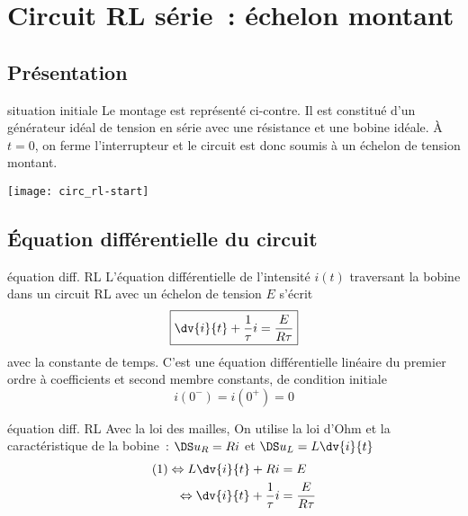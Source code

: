 \documentclass[../main/main.tex]{subfiles}
\begin{document}
\section{Circuit RL série~: échelon montant}
\subsection{Présentation}
\begin{defi}[label=def:echelonL, sidebyside]{situation initiale}
    Le montage est représenté ci-contre. Il est constitué d'un générateur idéal
    de tension en série avec une résistance et une bobine idéale. À $t=0$, on
    ferme l'interrupteur et le circuit est donc soumis à un échelon de tension
    montant.
    \tcblower
    \begin{center}
        \texttt{[image: circ\_rl-start]}
    \end{center}
\end{defi}

\subsection{Équation différentielle du circuit}
\begin{tcbraster}[raster columns=2, raster equal height=rows]
    \begin{prop}[label=prop:eqdiffrc]{équation diff. RL}
        L'équation différentielle de l'intensité $i(t)$ traversant la bobine
        dans un circuit RL avec un échelon de tension $E$ s'écrit
        \[ \boxed{\dv{i}{t} + \frac{1}{\tau}i = \frac{E}{R\tau}}\]
        avec  la constante de temps.
        \tcblower
        C'est une équation différentielle linéaire du premier ordre à
        coefficients et second membre constants, de condition initiale
        \[ \boxed{i(0^-) = i(0^+) = 0}\]
    \end{prop}
    \begin{demo}[label=demo:eqdiffrc]{équation diff. RL}
        Avec la loi des mailles,\smallbreak
        \linebreak
        On utilise la loi d'Ohm et la caractéristique de la bobine~:
        $\DS u_R = Ri$ et $\DS u_L = L \dv{i}{t}$
        \begin{align*}
            (1) \Leftrightarrow L\dv{i}{t} + Ri         & = E\\
            \Leftrightarrow \dv{i}{t} + \frac{1}{\tau}i & = \frac{E}{R\tau}
        \end{align*}
    \end{demo}
\end{tcbraster}
\end{document}
